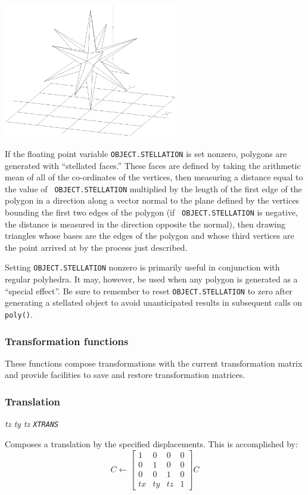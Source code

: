 \documentclass{article}
\begin{document}
\centerline{\includegraphics[width=3in]{cwfig14.eps}}

If the floating point variable {\tt OBJECT.STELLATION} is set
nonzero, polygons are generated with ``stellated faces.''  These faces
are defined by taking the arithmetic mean of all of the co-ordinates of
the vertices, then measuring a distance equal to the value of {\tt
OBJECT.STELLATION} multiplied by the length of the first edge of the
polygon in a direction along a vector normal to the plane defined by
the vertices bounding the first two edges of the polygon (if {\tt
OBJECT.STELLATION} is negative, the distance is measured in the
direction opposite the normal), then drawing triangles whose bases are
the edges of the polygon and whose third vertices are the point
arrived at by the process just described.

Setting {\tt OBJECT.STELLATION} nonzero is primarily useful in
conjunction with regular polyhedra.
It may, however, be used
when any polygon is generated as a ``special effect''.  Be sure to
remember to reset {\tt OBJECT.STELLATION} to zero after generating a
stellated object to avoid unanticipated results in subsequent calls on
{\tt poly()}.

\subsubsection{Transformation functions}

These functions compose transformations with the current
transformation matrix and provide facilities to save and restore
transformation matrices.

\subsubsection{Translation}

{\em tz ty tz {\tt XTRANS}}

Composes a translation by the specified displacements.
This is accomplished by:
\[ C \leftarrow \left[ \begin{array}{cccc}
        1 & 0 & 0 & 0 \\
        0 & 1 & 0 & 0 \\
        0 & 0 & 1 & 0 \\
        \mathit{tx} & \mathit{ty} & \mathit{tz} & 1
\end{array} \right] C \]
\end{document}
